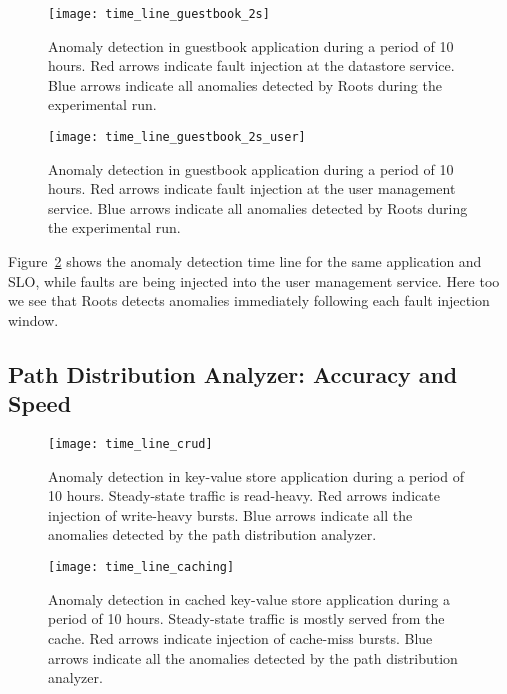 \begin{figure}
\centering
\texttt{[image: time\_line\_guestbook\_2s]}
\caption{Anomaly detection in guestbook application during a period of 10 hours. Red arrows indicate fault injection 
at the datastore service. Blue arrows indicate all anomalies detected by Roots during the experimental run.}
\label{fig:time_line_guestbook_2s}
\end{figure}

\begin{figure}
\centering
\texttt{[image: time\_line\_guestbook\_2s\_user]}
\caption{Anomaly detection in guestbook application during a period of 10 hours. Red arrows indicate fault injection
at the user management service. Blue arrows indicate all anomalies detected by Roots during the experimental run.}
\label{fig:time_line_guestbook_2s_user}
\end{figure}

Figure~\ref{fig:time_line_guestbook_2s_user} shows the anomaly detection time line for the 
same application and SLO, while faults are being injected into the user management service.
Here too we see that Roots detects anomalies immediately following each fault injection window.


\subsection{Path Distribution Analyzer: Accuracy and Speed}
\begin{figure}
\centering
\texttt{[image: time\_line\_crud]}
\caption{Anomaly detection in key-value store application during a period of 10 hours. Steady-state traffic is read-heavy. Red arrows
indicate injection of write-heavy bursts. Blue arrows indicate all the anomalies detected by the path distribution
analyzer.}
\label{fig:time_line_crud}
\end{figure}

\begin{figure}
\centering
\texttt{[image: time\_line\_caching]}
\caption{Anomaly detection in cached key-value store application during a period of 10 hours. Steady-state traffic is mostly
served from the cache. Red arrows
indicate injection of cache-miss bursts. Blue arrows indicate all the anomalies detected by the path distribution
analyzer.}
\label{fig:time_line_caching}
\end{figure}

